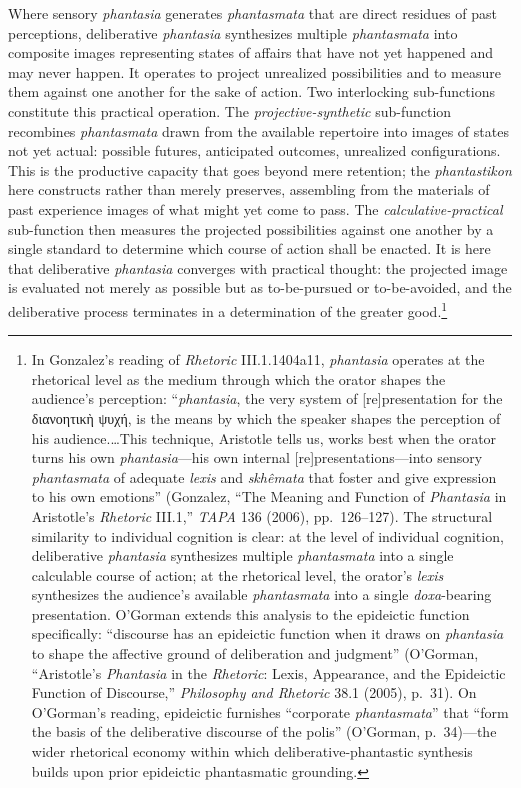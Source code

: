 \documentclass{article}
\newcommand{\gk}[1]{{\greekfont #1}}
\begin{document}
Where sensory \textit{phantasia} generates \textit{phantasmata} that are direct residues of past perceptions, deliberative \textit{phantasia} synthesizes multiple \textit{phantasmata} into composite images representing states of affairs that have not yet happened and may never happen. It operates to project unrealized possibilities and to measure them against one another for the sake of action. Two interlocking sub-functions constitute this practical operation. The \textit{projective-synthetic} sub-function recombines \textit{phantasmata} drawn from the available repertoire into images of states not yet actual: possible futures, anticipated outcomes, unrealized configurations. This is the productive capacity that goes beyond mere retention; the \textit{phantastikon} here constructs rather than merely preserves, assembling from the materials of past experience images of what might yet come to pass. The \textit{calculative-practical} sub-function then measures the projected possibilities against one another by a single standard to determine which course of action shall be enacted. It is here that deliberative \textit{phantasia} converges with practical thought: the projected image is evaluated not merely as possible but as to-be-pursued or to-be-avoided, and the deliberative process terminates in a determination of the greater good.\footnote{In Gonzalez's reading of \textit{Rhetoric} III.1.1404a11, \textit{phantasia} operates at the rhetorical level as the medium through which the orator shapes the audience's perception: ``\textit{phantasia}, the very system of [re]presentation for the \gk{διανοητικὴ ψυχή}, is the means by which the speaker shapes the perception of his audience.\dots This technique, Aristotle tells us, works best when the orator turns his own \textit{phantasia}---his own internal [re]presentations---into sensory \textit{phantasmata} of adequate \textit{lexis} and \textit{skhêmata} that foster and give expression to his own emotions'' (Gonzalez, ``The Meaning and Function of \textit{Phantasia} in Aristotle's \textit{Rhetoric} III.1,'' \textit{TAPA} 136 (2006), pp.~126--127). The structural similarity to individual cognition is clear: at the level of individual cognition, deliberative \textit{phantasia} synthesizes multiple \textit{phantasmata} into a single calculable course of action; at the rhetorical level, the orator's \textit{lexis} synthesizes the audience's available \textit{phantasmata} into a single \textit{doxa}-bearing presentation. O'Gorman extends this analysis to the epideictic function specifically: ``discourse has an epideictic function when it draws on \textit{phantasia} to shape the affective ground of deliberation and judgment'' (O'Gorman, ``Aristotle's \textit{Phantasia} in the \textit{Rhetoric}: Lexis, Appearance, and the Epideictic Function of Discourse,'' \textit{Philosophy and Rhetoric} 38.1 (2005), p.~31). On O'Gorman's reading, epideictic furnishes ``corporate \textit{phantasmata}'' that ``form the basis of the deliberative discourse of the polis'' (O'Gorman, p.~34)---the wider rhetorical economy within which deliberative-phantastic synthesis builds upon prior epideictic phantasmatic grounding.}
\end{document}
